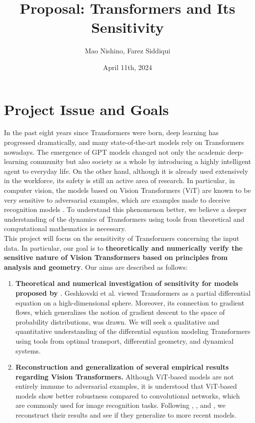 \documentclass[
	12pt, %
]{../Template/fphw}
\title{Proposal: Transformers and Its Sensitivity} %
\author{Mao Nishino, Farez Siddiqui} %
\date{April 11th, 2024} %
\institute{Florida State University \\ Department of Computer Science} %
\begin{document}
\maketitle %

\section*{Project Issue and Goals} 
In the past eight years since Transformers \cite{att} were born, deep learning has progressed dramatically, and many state-of-the-art models rely on Transformers nowadays. The emergence of GPT models \cite{radford2018improving} changed not only the academic deep-learning community but also society as a whole by introducing a highly intelligent agent to everyday life. On the other hand, although it is already used extensively in the workforce, its safety is still an active area of research. In particular, in computer vision, the models based on Vision Transformers (ViT) are known to be very sensitive to adversarial examples, which are examples made to deceive recognition models \cite{salman2024intriguing}. To understand this phenomenon better, we believe a deeper understanding of the dynamics of Transformers using tools from theoretical and computational mathematics is necessary. \\

This project will focus on the sensitivity of Transformers concerning the input data. In particular, our goal is to \textbf{theoretically and numerically verify the sensitive nature of Vision Transformers based on principles from analysis and geometry}. Our aims are described as follows:

\begin{enumerate}
    \item \textbf{Theoretical and numerical investigation of sensitivity for models proposed by \cite{geshkovski2024mathematical}}. Geshkovski et al. viewed Transformers as a partial differential equation on a high-dimensional sphere. Moreover, its connection to gradient flows, which generalizes the notion of gradient descent to the space of probability distributions, was drawn. We will seek a qualitative and quantitative understanding of the differential equation modeling Transformers using tools from optimal transport, differential geometry, and dynamical systems.
    \item \textbf{Reconstruction and generalization of several empirical results regarding Vision Transformers.} Although ViT-based models are not entirely immune to adversarial examples, it is understood that ViT-based models show better robustness compared to convolutional networks, which are commonly used for image recognition tasks. Following \cite{naseer2021intriguing}, \cite{zhou2022understanding}, and \cite{salman2024intriguing}, we reconstruct their results and see if they generalize to more recent models. 

    
\end{enumerate}
\end{document}
